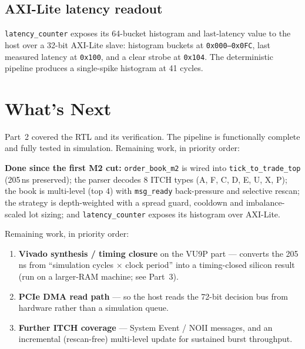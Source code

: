 \documentclass[11pt,a4paper]{article}
\begin{document}
\subsection{AXI-Lite latency readout}

\texttt{latency\_counter} exposes its 64-bucket histogram and last-latency value
to the host over a 32-bit AXI-Lite slave: histogram buckets at
\texttt{0x000--0x0FC}, last measured latency at \texttt{0x100}, and a clear strobe
at \texttt{0x104}. The deterministic pipeline produces a single-spike histogram at
41 cycles.

\section{What's Next}

Part~2 covered the RTL and its verification. The pipeline is functionally
complete and fully tested in simulation. Remaining work, in priority order:

\textbf{Done since the first M2 cut:} \texttt{order\_book\_m2} is wired into
\texttt{tick\_to\_trade\_top} (205\,ns preserved); the parser decodes 8 ITCH
types (A, F, C, D, E, U, X, P); the book is multi-level (top 4) with
\texttt{msg\_ready} back-pressure and selective rescan; the strategy is
depth-weighted with a spread guard, cooldown and imbalance-scaled lot sizing;
and \texttt{latency\_counter} exposes its histogram over AXI-Lite.

\noindent Remaining work, in priority order:

\begin{enumerate}
  \item \textbf{Vivado synthesis / timing closure} on the VU9P part --- converts
    the 205\,ns from ``simulation cycles $\times$ clock period'' into a
    timing-closed silicon result (run on a larger-RAM machine; see Part~3).
  \item \textbf{PCIe DMA read path} --- so the host reads the 72-bit decision bus
    from hardware rather than a simulation queue.
  \item \textbf{Further ITCH coverage} --- System Event / NOII messages, and an
    incremental (rescan-free) multi-level update for sustained burst throughput.
\end{enumerate}
\end{document}
